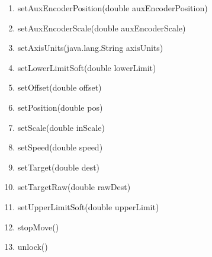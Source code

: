 \documentclass[10pt,letter,twoside]{report}
\begin{document}
\begin{enumerate}
\item setAuxEncoderPosition(double auxEncoderPosition) 
\item setAuxEncoderScale(double auxEncoderScale) 
\item setAxisUnits(java.lang.String axisUnits) 
\item setLowerLimitSoft(double lowerLimit) 
\item setOffset(double offset) 
\item setPosition(double pos) 
\item setScale(double inScale) 
\item setSpeed(double speed) 
\item setTarget(double dest) 
\item setTargetRaw(double rawDest) 
\item setUpperLimitSoft(double upperLimit) 
\item stopMove() 
\item unlock() 
\end{enumerate}
\end{document}
